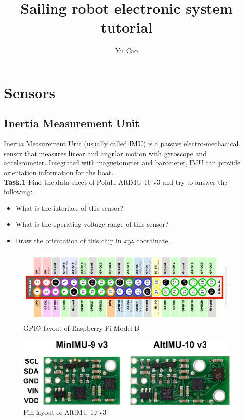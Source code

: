 \documentclass[]{article}
\title{Sailing robot electronic system tutorial}
\author{Yu Cao}
\begin{document}
\maketitle

\section{Sensors}
\subsection{Inertia Measurement Unit}
Inertia Measurement Unit (usually called IMU) is a passive electro-mechanical sensor that measures linear and angular motion with gyroscope and accelerometer. Integrated with magnetometer and barometer, IMU can provide orientation information for the boat. \\

\textbf{Task.1} Find the data-sheet of Polulu AltIMU-10 v3 and try to answer the following:
 \begin{itemize}
 	\item What is the interface of this sensor?
 	\item What is the operating voltage range of this sensor?
 	\item Draw the orientation of this chip in $xyz$ coordinate.
 \end{itemize}
 
 
\begin{figure}[tbph]
\centering
\includegraphics[width=0.7\linewidth]{Raspberry-Pi-GPIO-Layout.png}
\caption{GPIO layout of Raspberry Pi Model B}
\label{fig:raspberry-pi-gpio-layout}
\end{figure}
 
\begin{figure}[tbph]
\centering
\includegraphics[width=0.5\linewidth]{IMU.jpg}
\caption{Pin layout of AltIMU-10 v3}
\label{fig:0j5187}
\end{figure}
\end{document}
